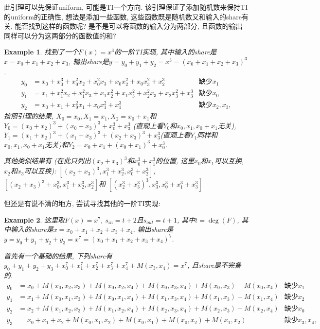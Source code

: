 \documentclass[a4paper,12pt]{ctexart}
\newtheorem{example}{Example}[subsection]
\begin{document}
此引理可以先保证uniform, 可能是TI一个方向. 
该引理保证了添加随机数来保持TI的uniform的正确性, 想法是添加一些函数, 这些函数既是随机数又和输入的share有关, 能否找到这样的函数呢?
是不是可以将函数的输入分为两部分, 且函数的输出同样可以分为这两部分的函数值的和?
\begin{example}
    找到了一个$F(x)=x^3$的一阶TI实现, 其中输入的share是$x=x_0+x_1+x_2+x_3$, 输出share是$y=y_0+y_1+y_2=x^3=(x_0+x_1+x_2+x_3)^3$.
    \begin{align*}
        y_0 &=  x_0 + x_0^3 + x_0^2x_2 + x_0^2x_3 + x_0x_2^2 + x_0x_3^2 + x_2^3 &\text{缺少}x_1\\
        y_1 &= x_1+x_1^2x_2 + x_1^2x_3 + x_1x_2^2 + x_1x_3^2  + x_2^2x_3 + x_2x_3^2 + x_3^3&\text{缺少}x_0\\
        y_2 &=  x_0 + x_1+x_0^2x_1 + x_0x_1^2 + x_1^3&\text{缺少}x_2,x_3,
    \end{align*}
    按照引理的结果, $X_0=x_0,X_1=x_1,X_2=x_0+x_1$和$Y_0=(x_0+x_2)^3+(x_0+x_3)^3+x_0^3+x_3^3$ (直观上看$Y_0$和$x_0,x_1,x_0+x_1$无关), $Y_1=(x_1+x_2)^3+(x_1+x_3)^3+(x_2+x_3)^3+x_3^3$(直观上看$Y_1$同样和$x_0,x_1,x_0+x_1$无关)和$Y_2=x_0+x_1+(x_0+x_1)^3+x_0^3$. 

    其他类似结果有 (在此只列出$(x_2+x_3)^3$和$x_0^3+x_1^3$的位置, 这里$x_0$和$x_1$可以互换, $x_2$和$x_3$可以互换):
    $\left[ (x_2+x_3)^3,x_1^3+x_2^3,x_0^3+x_2^3 \right]$, $\left[ (x_2+x_3)^3+x_0^3,x_1^3+x_2^3,x_2^3 \right]$和
    $\left[ (x_2^3+x_3^3)^3,x_3^3,x_0^3+x_1^3+x_3^3 \right]$

\end{example}
    但还是有说不清的地方, 尝试寻找其他的一阶TI实现: 
\begin{example}
    这里取$F(x)=x^7$, $s_{in}=t+2$且$s_{out}=t+1$, 其中$t=\deg(F)$, 其中输入的share是$x=x_0+x_1+x_2+x_3+x_4$, 输出share是$y=y_0+y_1+y_2+y_3=x^7=(x_0+x_1+x_2+x_3+x_4)^7$.

    首先有一个基础的结果, 下列share有$y_0+y_1+y_2+y_3+x_0^7+x_1^7+x_2^7+x_3^7+x_4^7+M(x_3,x_4)=x^7$, 且share是不完备的.
    \begin{align*}
        y_0 &= x_0+M(x_0,x_2,x_3)+M(x_0,x_2,x_4)+M(x_0,x_3,x_4)+M(x_0,x_3)+M(x_0,x_4)&\text{缺少}x_1\\
        y_1 &= x_1+M(x_0,x_1,x_3)+M(x_0,x_1,x_4)+M(x_1,x_3,x_4)+M(x_1,x_3)+M(x_1,x_4)&\text{缺少}x_2\\
        y_2 &= x_2+M(x_1,x_2,x_3)+M(x_1,x_2,x_4)+M(x_2,x_3,x_4)+M(x_2,x_3)+M(x_2,x_4)&\text{缺少}x_0\\
        y_3 &= x_0+x_1+x_2+M(x_0,x_1,x_2)+M(x_0,x_1)+M(x_0,x_2)+M(x_1,x_2)&\text{缺少}x_3,x_4,
    \end{align*}

\end{example}
\end{document}
